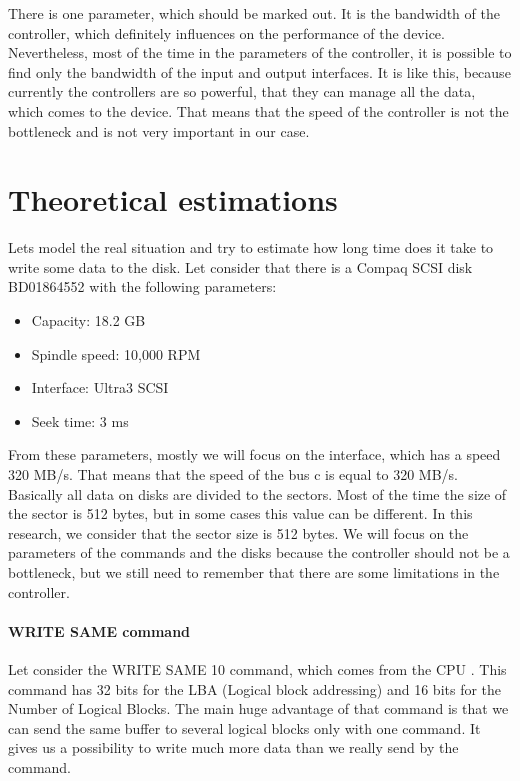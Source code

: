 There is one parameter, which should be marked out. It is the bandwidth of the controller, which definitely influences on the performance of the device. Nevertheless, most of the time in the parameters of the controller, it is possible to find only the bandwidth of the input and output interfaces. It is like this, because currently the controllers are so powerful, that they can manage all the data, which comes to the device. That means that the speed of the controller is not the bottleneck and is not very important in our case.

\section{Theoretical estimations}
\label{sec:theory_est}

Lets model the real situation and try to estimate how long time does it take to write some data to the disk. Let consider that there is a Compaq SCSI disk BD01864552 with the following parameters: 
\begin{itemize}
	\setlength{\itemsep}{-2mm}
	\item Capacity: 18.2 GB
	\item Spindle speed: 10,000 RPM
	\item Interface: Ultra3 SCSI
	\item Seek time: 3 ms
\end{itemize}
From these parameters, mostly we will focus on the interface, which has a speed 320 MB/s. That means that the speed of the bus c is equal to 320 MB/s. Basically all data on disks are divided to the sectors. Most of the time the size of the sector is 512 bytes, but in some cases this value can be different. In this research, we consider that the sector size is 512 bytes. We will focus on the parameters of the commands and the disks because the controller should not be a bottleneck, but we still need to remember that there are some limitations in the controller.

\paragraph{WRITE SAME command}
Let consider the WRITE SAME 10 command, which comes from the CPU \cite{scsi3_bc}. This command has 32 bits for the LBA (Logical block addressing) and 16 bits for the Number of Logical Blocks. The main huge advantage of that command is that we can send the same buffer to several logical blocks only with one command. It gives us a possibility to write much more data than we really send by the command.

